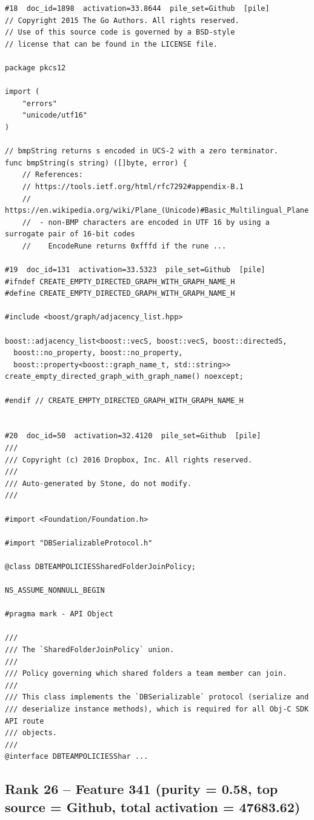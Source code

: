 \begin{verbatim}
#18  doc_id=1898  activation=33.8644  pile_set=Github  [pile]
// Copyright 2015 The Go Authors. All rights reserved.
// Use of this source code is governed by a BSD-style
// license that can be found in the LICENSE file.

package pkcs12

import (
	"errors"
	"unicode/utf16"
)

// bmpString returns s encoded in UCS-2 with a zero terminator.
func bmpString(s string) ([]byte, error) {
	// References:
	// https://tools.ietf.org/html/rfc7292#appendix-B.1
	// https://en.wikipedia.org/wiki/Plane_(Unicode)#Basic_Multilingual_Plane
	//  - non-BMP characters are encoded in UTF 16 by using a surrogate pair of 16-bit codes
	//	  EncodeRune returns 0xfffd if the rune ...

#19  doc_id=131  activation=33.5323  pile_set=Github  [pile]
#ifndef CREATE_EMPTY_DIRECTED_GRAPH_WITH_GRAPH_NAME_H
#define CREATE_EMPTY_DIRECTED_GRAPH_WITH_GRAPH_NAME_H

#include <boost/graph/adjacency_list.hpp>

boost::adjacency_list<boost::vecS, boost::vecS, boost::directedS,
  boost::no_property, boost::no_property,
  boost::property<boost::graph_name_t, std::string>>
create_empty_directed_graph_with_graph_name() noexcept;

#endif // CREATE_EMPTY_DIRECTED_GRAPH_WITH_GRAPH_NAME_H


#20  doc_id=50  activation=32.4120  pile_set=Github  [pile]
///
/// Copyright (c) 2016 Dropbox, Inc. All rights reserved.
///
/// Auto-generated by Stone, do not modify.
///

#import <Foundation/Foundation.h>

#import "DBSerializableProtocol.h"

@class DBTEAMPOLICIESSharedFolderJoinPolicy;

NS_ASSUME_NONNULL_BEGIN

#pragma mark - API Object

///
/// The `SharedFolderJoinPolicy` union.
///
/// Policy governing which shared folders a team member can join.
///
/// This class implements the `DBSerializable` protocol (serialize and
/// deserialize instance methods), which is required for all Obj-C SDK API route
/// objects.
///
@interface DBTEAMPOLICIESShar ...

\end{verbatim}

\subsection*{Rank 26 -- Feature 341 (purity = 0.58, top source = Github, total activation = 47683.62)}

